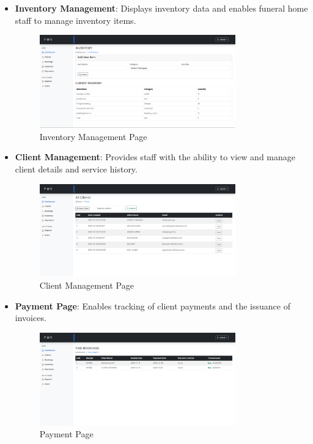\documentclass[a4paper,12pt]{report}
\begin{document}
\begin{itemize}
    \item \textbf{Inventory Management}: Displays inventory data and enables funeral home staff to manage inventory items.
    \begin{figure}[ht]
        \centering
        \includegraphics[width=0.8\textwidth]{img/inventory.png}
        \caption{Inventory Management Page}
        \label{fig:inventory_ui}
    \end{figure}
    
    \item \textbf{Client Management}: Provides staff with the ability to view and manage client details and service history.
    \begin{figure}[ht]
        \centering
        \includegraphics[width=0.8\textwidth]{img/clients.png}
        \caption{Client Management Page}
        \label{fig:client_ui}
    \end{figure}

    \item \textbf{Payment Page}: Enables tracking of client payments and the issuance of invoices.
    \begin{figure}[ht]
        \centering
        \includegraphics[width=0.8\textwidth]{img/payment.png}
        \caption{Payment Page}
        \label{fig:payment_ui}
    \end{figure}
\end{itemize}
\end{document}
